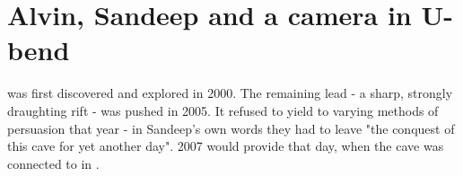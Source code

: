 \section{Alvin, Sandeep and a camera in U-bend}


 was first discovered and explored in 2000. The remaining lead - a sharp, strongly draughting rift - was pushed in 2005. It refused to yield to varying methods of persuasion that year - in Sandeep's own words they had to leave "the conquest of this cave for yet another day". 2007 would provide that day, when the cave was connected to  in .


